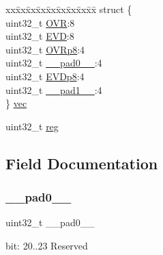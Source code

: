 \begin{DoxyCompactItemize}
\begin{tabbing}
\end{tabbing}\item 
\begin{tabbing}
xx\=xx\=xx\=xx\=xx\=xx\=xx\=xx\=xx\=\kill
struct \{\\
\>uint32\_t \mbox{\hyperlink{union_e_v_s_y_s___i_n_t_e_n_s_e_t___type_a89687389646540280d33d90ddd04812d}{OVR}}:8\\
\>uint32\_t \mbox{\hyperlink{union_e_v_s_y_s___i_n_t_e_n_s_e_t___type_aa536a4aac53f81914dc569bf2aecf5d1}{EVD}}:8\\
\>uint32\_t \mbox{\hyperlink{union_e_v_s_y_s___i_n_t_e_n_s_e_t___type_a107b1d8f96371c7b3eff3719946daaeb}{OVRp8}}:4\\
\>uint32\_t \mbox{\hyperlink{union_e_v_s_y_s___i_n_t_e_n_s_e_t___type_a3e57c2ef1c3ffb36722f000cc1156824}{\_\_pad0\_\_}}:4\\
\>uint32\_t \mbox{\hyperlink{union_e_v_s_y_s___i_n_t_e_n_s_e_t___type_a7b62a828345e9dc20a51686cefefae42}{EVDp8}}:4\\
\>uint32\_t \mbox{\hyperlink{union_e_v_s_y_s___i_n_t_e_n_s_e_t___type_a6712ba6dd1d5b43d2d56ff8ac4e275a7}{\_\_pad1\_\_}}:4\\
\} \mbox{\hyperlink{union_e_v_s_y_s___i_n_t_e_n_s_e_t___type_a7991f7631764e55eb7df37c35a9f604b}{vec}}\\

\end{tabbing}\item 
uint32\+\_\+t \mbox{\hyperlink{union_e_v_s_y_s___i_n_t_e_n_s_e_t___type_a6b91636401516a477989a336376d7b40}{reg}}
\end{DoxyCompactItemize}


\subsection{Field Documentation}
\mbox{\label{union_e_v_s_y_s___i_n_t_e_n_s_e_t___type_a3e57c2ef1c3ffb36722f000cc1156824}} 
\subsubsection{\texorpdfstring{\_\_pad0\_\_}{\_\_pad0\_\_}}
{\footnotesize\ttfamily uint32\+\_\+t \+\_\+\+\_\+pad0\+\_\+\+\_\+}

bit\+: 20..23 Reserved \mbox{\label{union_e_v_s_y_s___i_n_t_e_n_s_e_t___type_a6712ba6dd1d5b43d2d56ff8ac4e275a7}} 
